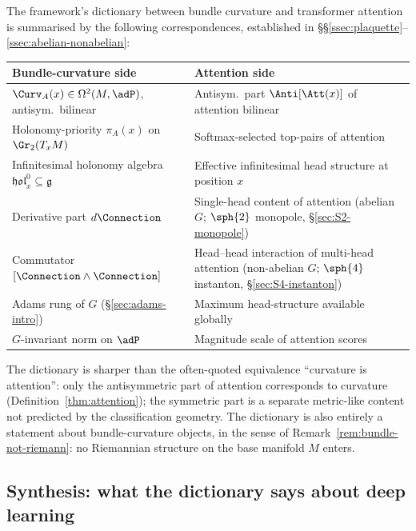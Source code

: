 The framework's dictionary between bundle curvature and transformer
attention is summarised by the following correspondences, established
in \S\S\ref{ssec:plaquette}--\ref{ssec:abelian-nonabelian}:

\begin{center}
\renewcommand{\arraystretch}{1.3}
\begin{tabular}{p{}p{}}
\toprule
\textbf{Bundle-curvature side} & \textbf{Attention side} \\
\midrule
$\Curv_A(x)\in\Omega^2(M,\adP)$, antisym.\ bilinear &
Antisym.\ part $\Anti[\Att(x)]$ of attention bilinear \\
Holonomy-priority $\pi_A(x)$ on $\Gr_2(T_xM)$ &
Softmax-selected top-pairs of attention \\
Infinitesimal holonomy algebra
$\mathfrak{hol}^0_x\subseteq\mathfrak{g}$ &
Effective infinitesimal head structure at position $x$ \\
Derivative part $d\Connection$ &
Single-head content of attention
(abelian $G$; $\sph{2}$ monopole, \S\ref{sec:S2-monopole}) \\
Commutator $[\Connection\wedge\Connection]$ &
Head--head interaction of multi-head attention
(non-abelian $G$; $\sph{4}$ instanton, \S\ref{sec:S4-instanton}) \\
Adams rung of $G$ (\S\ref{sec:adams-intro}) &
Maximum head-structure available globally \\
$G$-invariant norm on $\adP$ &
Magnitude scale of attention scores \\
\bottomrule
\end{tabular}
\end{center}

The dictionary is sharper than the often-quoted equivalence
``curvature is attention'': only the antisymmetric part of attention
corresponds to curvature (Definition~\ref{thm:attention}); the symmetric
part is a separate metric-like content not predicted by the
classification geometry. The dictionary is also entirely a statement
about bundle-curvature objects, in the sense of
Remark~\ref{rem:bundle-not-riemann}: no Riemannian structure on the
base manifold $M$ enters.

\subsection{Synthesis: what the dictionary says about deep learning}
\label{ssec:synthesis}\label{sec:adams-intro}

